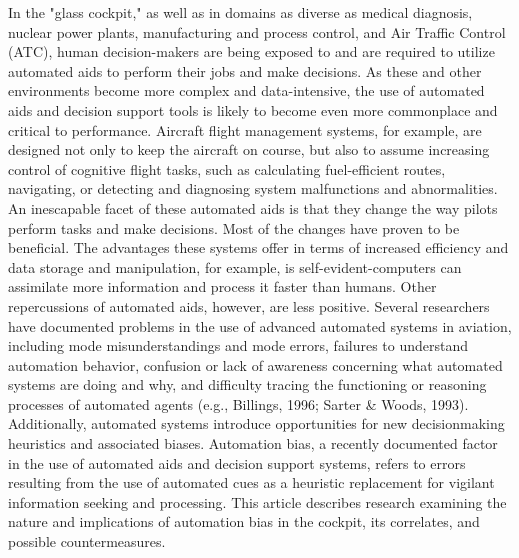 \documentclass[utf8,bachelor,manualbib]{gradu3}
\begin{document}
In the "glass cockpit," as well as in domains as diverse as medical diagnosis, nuclear
power plants, manufacturing and process control, and Air Traffic Control (ATC),
human decision-makers are being exposed to and are required to utilize automated
aids to perform their jobs and make decisions. As these and other environments
become more complex and data-intensive, the use of automated aids and decision
support tools is likely to become even more commonplace and critical to performance.
Aircraft flight management systems, for example, are designed not only to
keep the aircraft on course, but also to assume increasing control of cognitive flight
tasks, such as calculating fuel-efficient routes, navigating, or detecting and diagnosing
system malfunctions and abnormalities. An inescapable facet of these
automated aids is that they change the way pilots perform tasks and make decisions.
Most of the changes have proven to be beneficial. The advantages these systems
offer in terms of increased efficiency and data storage and manipulation, for
example, is self-evident-computers can assimilate more information and process
it faster than humans.
Other repercussions of automated aids, however, are less positive. Several
researchers have documented problems in the use of advanced automated systems
in aviation, including mode misunderstandings and mode errors, failures to understand
automation behavior, confusion or lack of awareness concerning what automated
systems are doing and why, and difficulty tracing the functioning or
reasoning processes of automated agents (e.g., Billings, 1996; Sarter \& Woods,
1993). Additionally, automated systems introduce opportunities for new decisionmaking
heuristics and associated biases. Automation bias, a recently documented
factor in the use of automated aids and decision support systems, refers to errors
resulting from the use of automated cues as a heuristic replacement for vigilant
information seeking and processing. This article describes research examining the
nature and implications of automation bias in the cockpit, its correlates, and possible
countermeasures. \citep{mosier1998}
\end{document}
